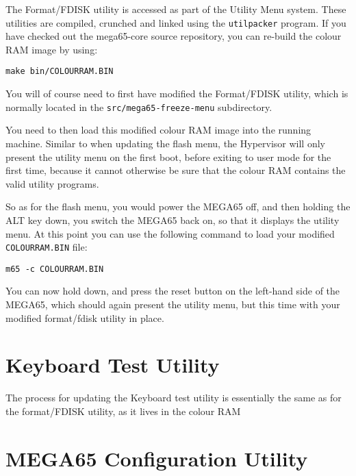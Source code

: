 The Format/FDISK utility is accessed as part of the Utility Menu system.  These utilities are compiled, crunched and linked using the
{\tt utilpacker} program.  If you have checked out the mega65-core source repository, you can re-build the colour RAM image by using:

\begin{tcolorbox}[colback=black,coltext=white]
\verbatimfont{\codefont}
\begin{verbatim}
make bin/COLOURRAM.BIN
\end{verbatim}
\end{tcolorbox}

You will of course need to first have modified the Format/FDISK utility, which is normally located in the {\tt src/mega65-freeze-menu} subdirectory.

You need to then load this modified colour RAM image into the running machine. Similar to when updating the flash menu, the Hypervisor will
only present the utility menu on the first boot, before exiting to user mode for the first time, because it cannot otherwise be sure that
the colour RAM contains the valid utility programs.

So as for the flash menu, you would power the MEGA65 off, and then holding the ALT key down, you switch the MEGA65 back on, so that it displays the utility menu.  At this point you can use the following command to load your modified {\tt COLOURRAM.BIN} file:

\begin{tcolorbox}[colback=black,coltext=white]
\verbatimfont{\codefont}
\begin{verbatim}
m65 -c COLOURRAM.BIN
\end{verbatim}
\end{tcolorbox}

You can now hold  down, and press the reset button on the left-hand side of the MEGA65, which should
again present
the utility menu,
but this time with your modified format/fdisk utility in place.

\section{Keyboard Test Utility}

The process for updating the Keyboard test utility is essentially the same as for the format/FDISK utility, as it lives in the colour RAM

\section{MEGA65 Configuration Utility}

